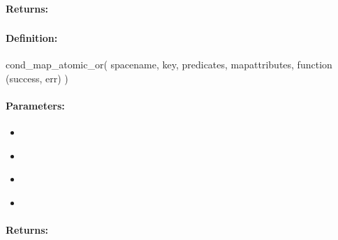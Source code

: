 \paragraph{Returns:}


\pagebreak
\subsubsection{}
\label{api:nodejs:cond_map_atomic_or}


\paragraph{Definition:}
\begin{javascriptcode}
cond_map_atomic_or(
        spacename, key, predicates, mapattributes, function (success, err) {})
\end{javascriptcode}
\paragraph{Parameters:}
\begin{itemize}[noitemsep]
\item {}\\

\item {}\\

\item {}\\

\item {}\\

\end{itemize}

\paragraph{Returns:}


\pagebreak
\subsubsection{}
\label{api:nodejs:map_atomic_xor}


